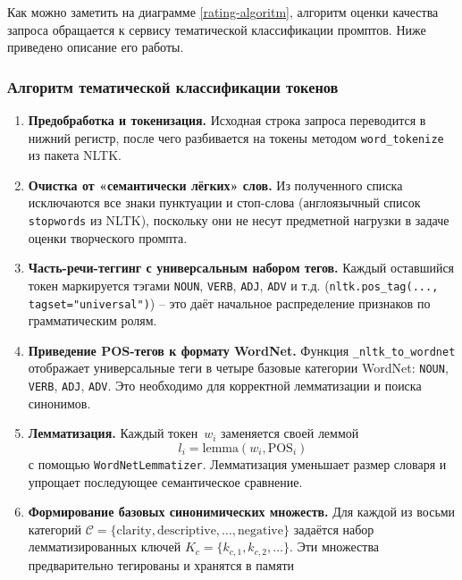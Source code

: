Как можно заметить на диаграмме \ref{rating-algoritm}, алгоритм оценки качества запроса обращается к сервису тематической классификации промптов.  
Ниже приведено описание его работы.

\subsubsection*{Алгоритм тематической классификации токенов}

\begin{enumerate}[label=\arabic*]
  \item \textbf{Предобработка и токенизация.}  
        Исходная строка запроса переводится в нижний регистр, после чего
        разбивается на токены методом \verb|word_tokenize| из пакета NLTK.
  \item \textbf{Очистка от «семантически лёгких» слов.}  
        Из полученного списка исключаются все знаки пунктуации и стоп-слова
        (англоязычный список \verb|stopwords| из NLTK), поскольку они
        не несут предметной нагрузки в задаче оценки творческого промпта.
  \item \textbf{Часть-речи-теггинг с универсальным набором тегов.}  
        Каждый оставшийся токен маркируется тэгами
        \texttt{NOUN}, \texttt{VERB}, \texttt{ADJ}, \texttt{ADV} и т.д.
        (\verb|nltk.pos_tag(..., tagset="universal")|) – это даёт
        начальное распределение признаков по грамматическим ролям.
  \item \textbf{Приведение POS-тегов к формату WordNet.}  
        Функция \verb|_nltk_to_wordnet| отображает универсальные теги
        в четыре базовые категории WordNet: \texttt{NOUN}, \texttt{VERB},
        \texttt{ADJ}, \texttt{ADV}. Это необходимо для корректной
        лемматизации и поиска синонимов.
  \item \textbf{Лемматизация.}  
        Каждый токен \(\,w_i\) заменяется своей леммой
        \begin{equation}
        l_i=\mathrm{lemma}(w_i,\mathrm{POS}_i)
        \end{equation} с помощью
        \verb|WordNetLemmatizer|. Лемматизация уменьшает
        размер словаря и упрощает последующее семантическое сравнение.
  \item \textbf{Формирование базовых синонимических множеств.}  
        Для каждой из восьми категорий  
        \(\mathcal{C}=\{\text{clarity},\text{descriptive},\ldots,\text{negative}\}\)
        задаётся набор лемматизированных ключей
        \(K_c=\{k_{c,1},k_{c,2},\ldots\}\).
        Эти множества предварительно тегированы и хранятся в памяти

\end{enumerate}

